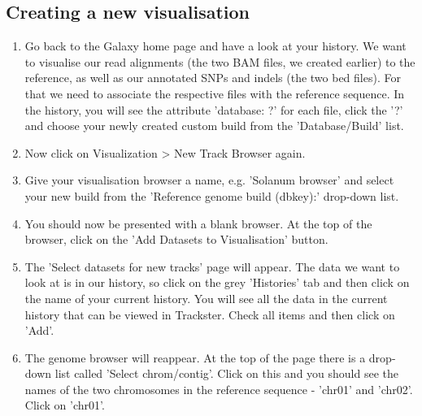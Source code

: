 \documentclass[12pt,a4paper]{article}
\begin{document}
\subsection{Creating a new visualisation}
\begin{enumerate}
        \item Go back to the Galaxy home page and have a look at your
          history. We want to visualise our read alignments (the two
          BAM files, we created earlier) to the reference, as well as
          our annotated SNPs and indels (the two bed files).  For that
          we need to associate the respective files with the reference
          sequence. In the history, you will see the attribute
          'database: ?' for each file, click the '?' and choose your
          newly created custom build from the 'Database/Build' list.
	\item Now click on Visualization > New Track Browser again.
	\item Give your visualisation browser a name, e.g. 'Solanum
          browser' and select your new build from the 'Reference
          genome build (dbkey):' drop-down list.
	\item You should now be presented with a blank browser. At the
          top of the browser, click on the 'Add Datasets to
          Visualisation' button.
	\item The 'Select datasets for new tracks' page will
          appear. The data we want to look at is in our history, so
          click on the grey 'Histories' tab and then click on the name
          of your current history. You will see all the data in the
          current history that can be viewed in Trackster. %
          Check all items and then click on 'Add'. 
	\item The genome browser will reappear. At the top of the page
          there is a drop-down list called 'Select
          chrom/contig'. Click on this and you should see the names of
          the two chromosomes in the reference sequence - 'chr01' and
          'chr02'. Click on 'chr01'.

\end{enumerate}
\end{document}
